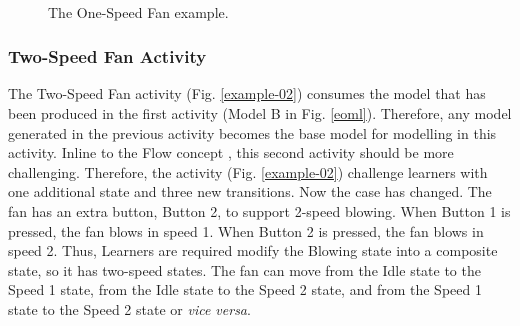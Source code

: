 \documentclass[conference]{IEEEtran}
\begin{document}
\begin{figure}[!t]
    \centering
    \\
	\caption{The One-Speed Fan example.}
    \label{example-01}
\end{figure}

\subsubsection{Two-Speed Fan Activity}
The Two-Speed Fan activity (Fig. \ref{example-02}) consumes the model that has been produced in the first activity (Model B in Fig. \ref{eoml}). Therefore, any model generated in the previous activity becomes the base model for modelling in this activity. Inline to the Flow concept \cite{csikszentmihalyi2014toward}, this second activity should be more challenging. Therefore, the activity (Fig. \ref{example-02}) challenge learners with one additional state and three new transitions. Now the case has changed. The fan has an extra button, Button 2, to support 2-speed blowing. When Button 1 is pressed, the fan blows in speed 1. When Button 2 is pressed, the fan blows in speed 2. Thus, Learners are required modify the Blowing state into a composite state, so it has two-speed states. The fan can move from the Idle state to the Speed 1 state, from the Idle state to the Speed 2 state, and from the Speed 1 state to the Speed 2 state or \textit{vice versa}.
\end{document}
